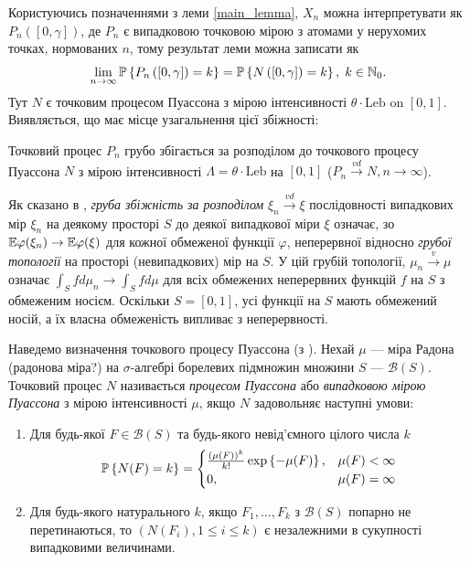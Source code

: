 Користуючись позначеннями з леми \ref{main_lemma}, $X_n$ можна інтерпретувати як
$P_n\left([0, \gamma] \right)$, де $P_n$ 
є випадковою точковою мірою 
з атомами у нерухомих точках, нормованих $n$, 
тому результат леми можна записати як 
\begin{gather*}
    \lim_{n\to\infty} \P{P_n\left([0, \gamma] \right) = k} = \P{N\left([0, \gamma] \right) = k}, \; k\in\N_0.
\end{gather*}
Тут $N$ є точковим процесом Пуассона
з {\color{red}мірою інтенсивності} $\theta \cdot \mathrm{Leb}$ on $[0, 1]$. 
Виявляється, що має місце узагальнення цієї збіжності:
\begin{theorem}\label{main_th}
    Точковий процес $P_n$ {\color{red}грубо збігається за розподілом} 
    до точкового процесу Пуассона $N$
    з мірою інтенсивності $\Lambda = \theta \cdot \mathrm{Leb}$ на $[0, 1]$ 
    ($P_n \overset{vd}{\longrightarrow} N, n\to\infty$).
\end{theorem}

Як сказано в \cite{Kallenberg_2017}, \emph{груба збіжність за розподілом} 
$\xi_n \overset{vd}{\longrightarrow} \xi$ послідовності випадкових мір $\xi_n$
на деякому просторі $S$ до деякої випадкової міри $\xi$ означає, зо
$\E \varphi(\xi_n) \to \E \varphi(\xi)$
для кожної обмеженої функції $\varphi$, неперервної відносно \emph{грубої топології} на
просторі (невипадкових) мір на $S$. У цій грубій топології, $\mu_n \overset{v}{\longrightarrow} \mu$
означає $\int_S f d\mu_n \to \int_S f d\mu$ 
для всіх обмежених неперервних функцій $f$ на $S$ з обмеженим носієм.
Оскільки $S = [0,1]$, усі функції на $S$
мають обмежений носій, а їх власна обмеженість випливає з неперервності.

Наведемо визначення точкового процесу Пуассона (з \cite{Resnick_1987}). 
Нехай $\mu$ --- {\color{red}міра Радона (радонова міра?)}
на $\sigma$-алгебрі борелевих підмножин множини $S$ --- $\mathcal{B}(S)$.
Точковий процес $N$ називається \emph{процесом Пуассона} або
\emph{випадковою мірою Пуассона} з мірою інтенсивності $\mu$, якщо $N$ 
задовольняє наступні умови:
\begin{enumerate}
    \item Для будь-якої $F \in \mathcal{B}(S)$ та будь-якого невід'ємного цілого числа $k$
    \begin{gather*}
        \P{N(F) = k} = \begin{cases}
            \frac{(\mu(F))^k}{k!} \exp\left\{-\mu(F)\right\}, & \mu(F) < \infty \\
            0, & \mu(F) = \infty
        \end{cases}
    \end{gather*}
    \item Для будь-якого натурального $k$, 
    якщо $F_1, \dots, F_k$ з $\mathcal{B}(S)$ попарно не перетинаються, то
    $\left(N(F_i), 1\leq i \leq k\right)$ є незалежними в сукупності випадковими величинами.
\end{enumerate}

